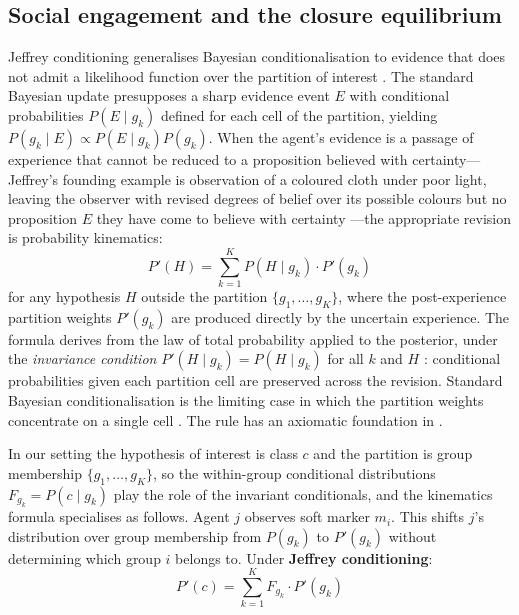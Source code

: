 \documentclass[12pt,a4paper]{article}
\theoremstyle{definition}
\numberwithin{proposition}{subsection}
\begin{document}
\subsection{Social engagement and the closure equilibrium}
\label{subsec:jeffrey}
\label{subsec:bilateral}
\label{subsec:interaction}
\label{sec:closure}

Jeffrey conditioning generalises Bayesian conditionalisation to evidence
that does not admit a likelihood function over the partition of interest
\citep{Jeffrey1965,Jeffrey2004}. The standard Bayesian update presupposes
a sharp evidence event $E$ with conditional probabilities $P(E \mid g_k)$
defined for each cell of the partition, yielding
$P(g_k \mid E) \propto P(E \mid g_k) P(g_k)$. When the agent's evidence is
a passage of experience that cannot be reduced to a proposition believed
with certainty---Jeffrey's founding example is observation of a coloured
cloth under poor light, leaving the observer with revised degrees of
belief over its possible colours but no proposition $E$ they have come
to believe with certainty \citep[\S 11.1]{Jeffrey1965}---the appropriate
revision is probability kinematics:
\begin{equation}
  P'(H) = \sum_{k=1}^{K} P(H \mid g_k) \cdot P'(g_k)
  \label{eq:kinematics}
\end{equation}
for any hypothesis $H$ outside the partition $\{g_1, \ldots, g_K\}$,
where the post-experience partition weights $P'(g_k)$ are produced
directly by the uncertain experience. The formula derives from the law
of total probability applied to the posterior, under the
\emph{invariance condition} $P'(H \mid g_k) = P(H \mid g_k)$ for all $k$
and $H$ \citep[\S\S 11.3, 11.6]{Jeffrey1965}: conditional probabilities
given each partition cell are preserved across the revision. Standard
Bayesian conditionalisation is the limiting case in which the partition
weights concentrate on a single cell \citep[\S 11.5]{Jeffrey1965}. The
rule has an axiomatic foundation in \citet{DiaconisZabell1982}.

In our setting the hypothesis of interest is class $c$ and the partition
is group membership $\{g_1, \ldots, g_K\}$, so the within-group
conditional distributions $F_{g_k} = P(c \mid g_k)$ play the role of the
invariant conditionals, and the kinematics formula specialises as
follows. Agent $j$ observes soft marker $m_i$. This shifts $j$'s
distribution over group membership from $P(g_k)$ to $P'(g_k)$ without
determining which group $i$ belongs to. Under
\textbf{Jeffrey conditioning}:
\begin{equation}
  P'(c) = \sum_{k=1}^{K} F_{g_k} \cdot P'(g_k)
  \label{eq:jeffrey}
\end{equation}
\end{document}
